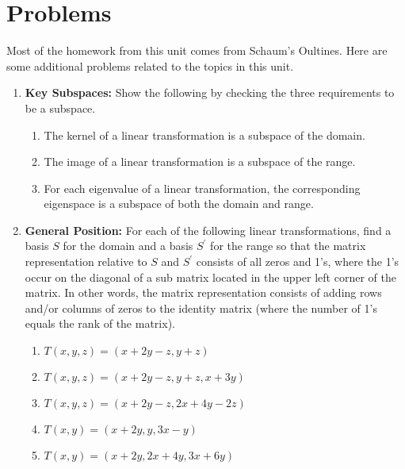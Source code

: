 

\section{Problems}

Most of the homework from this unit comes from Schaum's Oultines. Here are some additional problems related to the topics in this unit.

\begin{enumerate}

\item \textbf{Key Subspaces:} Show the following by checking the three requirements to be a subspace.
\begin{enumerate}
\item The kernel of a linear transformation is a subspace of the domain. 

\item The image of a linear transformation is a subspace of the range.

\item For each eigenvalue of a linear transformation, the corresponding eigenspace is a subspace of both the domain and range.
\end{enumerate}

\item  \textbf{General Position:} For each of the following linear transformations, find a basis $S$ for the domain and a basis $S^\prime$ for the range so that the matrix representation relative to $S$ and $S^\prime$ consists of all zeros and 1's, where the 1's occur on the diagonal of a sub matrix located in the upper left corner of the matrix.  In other words, the matrix representation consists of adding rows and/or columns of zeros to the identity matrix (where the number of 1's equals the rank of the matrix).

\begin{enumerate}

\item $T(x,y,z)=(x+2y-z,y+z)$

\item $T(x,y,z)=(x+2y-z,y+z,x+3y)$

\item $T(x,y,z)=(x+2y-z,2x+4y-2z)$

\item $T(x,y)=(x+2y,y,3x-y)$

\item $T(x,y)=(x+2y,2x+4y,3x+6y)$


\end{enumerate}
\end{enumerate}
